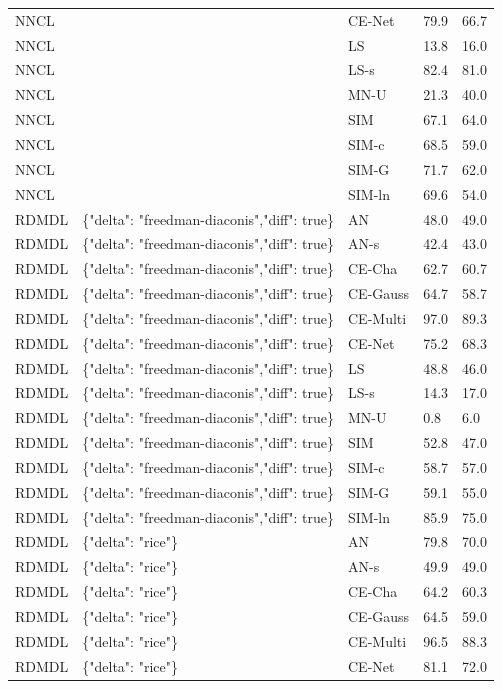 \begin{tabular}{lllll}
NNCL &  & CE-Net & 79.9 & 66.7 \\
NNCL &  & LS & 13.8 & 16.0 \\
NNCL &  & LS-s & 82.4 & 81.0 \\
NNCL &  & MN-U & 21.3 & 40.0 \\
NNCL &  & SIM & 67.1 & 64.0 \\
NNCL &  & SIM-c & 68.5 & 59.0 \\
NNCL &  & SIM-G & 71.7 & 62.0 \\
NNCL &  & SIM-ln & 69.6 & 54.0 \\
RDMDL & \{"delta": "freedman-diaconis","diff": true\} & AN & 48.0 & 49.0 \\
RDMDL & \{"delta": "freedman-diaconis","diff": true\} & AN-s & 42.4 & 43.0 \\
RDMDL & \{"delta": "freedman-diaconis","diff": true\} & CE-Cha & 62.7 & 60.7 \\
RDMDL & \{"delta": "freedman-diaconis","diff": true\} & CE-Gauss & 64.7 & 58.7 \\
RDMDL & \{"delta": "freedman-diaconis","diff": true\} & CE-Multi & 97.0 & 89.3 \\
RDMDL & \{"delta": "freedman-diaconis","diff": true\} & CE-Net & 75.2 & 68.3 \\
RDMDL & \{"delta": "freedman-diaconis","diff": true\} & LS & 48.8 & 46.0 \\
RDMDL & \{"delta": "freedman-diaconis","diff": true\} & LS-s & 14.3 & 17.0 \\
RDMDL & \{"delta": "freedman-diaconis","diff": true\} & MN-U & 0.8 & 6.0 \\
RDMDL & \{"delta": "freedman-diaconis","diff": true\} & SIM & 52.8 & 47.0 \\
RDMDL & \{"delta": "freedman-diaconis","diff": true\} & SIM-c & 58.7 & 57.0 \\
RDMDL & \{"delta": "freedman-diaconis","diff": true\} & SIM-G & 59.1 & 55.0 \\
RDMDL & \{"delta": "freedman-diaconis","diff": true\} & SIM-ln & 85.9 & 75.0 \\
RDMDL & \{"delta": "rice"\} & AN & 79.8 & 70.0 \\
RDMDL & \{"delta": "rice"\} & AN-s & 49.9 & 49.0 \\
RDMDL & \{"delta": "rice"\} & CE-Cha & 64.2 & 60.3 \\
RDMDL & \{"delta": "rice"\} & CE-Gauss & 64.5 & 59.0 \\
RDMDL & \{"delta": "rice"\} & CE-Multi & 96.5 & 88.3 \\
RDMDL & \{"delta": "rice"\} & CE-Net & 81.1 & 72.0 \\

\end{tabular}
